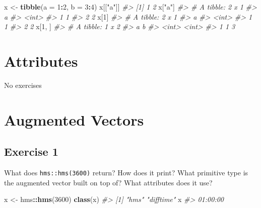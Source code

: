 \documentclass[]{book}
\newenvironment{Shaded}{\begin{snugshade}}{\end{snugshade}}
\newcommand{\CommentTok}[1]{\textcolor[rgb]{0.56,0.35,0.01}{\textit{#1}}}
\newcommand{\DataTypeTok}[1]{\textcolor[rgb]{0.13,0.29,0.53}{#1}}
\newcommand{\DecValTok}[1]{\textcolor[rgb]{0.00,0.00,0.81}{#1}}
\newcommand{\KeywordTok}[1]{\textcolor[rgb]{0.13,0.29,0.53}{\textbf{#1}}}
\newcommand{\NormalTok}[1]{#1}
\newcommand{\OperatorTok}[1]{\textcolor[rgb]{0.81,0.36,0.00}{\textbf{#1}}}
\newcommand{\StringTok}[1]{\textcolor[rgb]{0.31,0.60,0.02}{#1}}
\theoremstyle{plain}
\theoremstyle{remark}
\theoremstyle{definition}
\theoremstyle{definition}
\theoremstyle{definition}
\theoremstyle{remark}
\begin{document}
\begin{Shaded}
\begin{Highlighting}[]
\NormalTok{x <-}\StringTok{ }\KeywordTok{tibble}\NormalTok{(}\DataTypeTok{a =} \DecValTok{1}\OperatorTok{:}\DecValTok{2}\NormalTok{, }\DataTypeTok{b =} \DecValTok{3}\OperatorTok{:}\DecValTok{4}\NormalTok{)}
\NormalTok{x[[}\StringTok{"a"}\NormalTok{]]}
\CommentTok{#> [1] 1 2}
\NormalTok{x[}\StringTok{"a"}\NormalTok{]}
\CommentTok{#> # A tibble: 2 x 1}
\CommentTok{#>       a}
\CommentTok{#>   <int>}
\CommentTok{#> 1     1}
\CommentTok{#> 2     2}
\NormalTok{x[}\DecValTok{1}\NormalTok{]}
\CommentTok{#> # A tibble: 2 x 1}
\CommentTok{#>       a}
\CommentTok{#>   <int>}
\CommentTok{#> 1     1}
\CommentTok{#> 2     2}
\NormalTok{x[}\DecValTok{1}\NormalTok{, ]}
\CommentTok{#> # A tibble: 1 x 2}
\CommentTok{#>       a     b}
\CommentTok{#>   <int> <int>}
\CommentTok{#> 1     1     3}
\end{Highlighting}
\end{Shaded}

\hypertarget{attributes}{%
\section{Attributes}\label{attributes}}

No exercises

\hypertarget{augmented-vectors}{%
\section{Augmented Vectors}\label{augmented-vectors}}

\hypertarget{exercise-1-56}{%
\subsection{Exercise 1}\label{exercise-1-56}}

What does \texttt{hms::hms(3600)} return? How does it print? What
primitive type is the augmented vector built on top of? What attributes
does it use?

\begin{Shaded}
\begin{Highlighting}[]
\NormalTok{x <-}\StringTok{ }\NormalTok{hms}\OperatorTok{::}\KeywordTok{hms}\NormalTok{(}\DecValTok{3600}\NormalTok{)}
\KeywordTok{class}\NormalTok{(x)}
\CommentTok{#> [1] "hms"      "difftime"}
\NormalTok{x}
\CommentTok{#> 01:00:00}
\end{Highlighting}
\end{Shaded}
\end{document}
